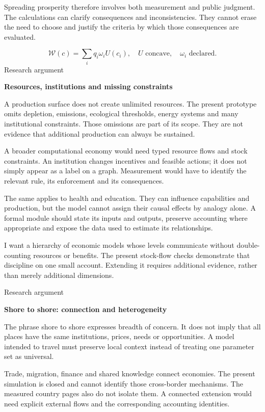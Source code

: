 \documentclass[10pt]{article}
\begin{document}
Spreading prosperity therefore involves both measurement and public judgment. The calculations can clarify consequences and inconsistencies. They cannot erase the need to choose and justify the criteria by which those consequences are evaluated.\par
\[\mathcal W(c)=\sum_iq_i\omega_i U(c_i),\quad U\text{ concave},\quad\omega_i\text{ declared}.\]
\clearpage
{\small\color{accent}Research argument}\par
{\LARGE\bfseries\color{ink}Resources, institutions and missing constraints}\par\vspace{7pt}
A production surface does not create unlimited resources. The present prototype omits depletion, emissions, ecological thresholds, energy systems and many institutional constraints. Those omissions are part of its scope. They are not evidence that additional production can always be sustained.\par
A broader computational economy would need typed resource flows and stock constraints. An institution changes incentives and feasible actions; it does not simply appear as a label on a graph. Measurement would have to identify the relevant rule, its enforcement and its consequences.\par
The same applies to health and education. They can influence capabilities and production, but the model cannot assign their causal effects by analogy alone. A formal module should state its inputs and outputs, preserve accounting where appropriate and expose the data used to estimate its relationships.\par
I want a hierarchy of economic models whose levels communicate without double-counting resources or benefits. The present stock-flow checks demonstrate that discipline on one small account. Extending it requires additional evidence, rather than merely additional dimensions.\par
\clearpage
{\small\color{accent}Research argument}\par
{\LARGE\bfseries\color{ink}Shore to shore: connection and heterogeneity}\par\vspace{7pt}
The phrase shore to shore expresses breadth of concern. It does not imply that all places have the same institutions, prices, needs or opportunities. A model intended to travel must preserve local context instead of treating one parameter set as universal.\par
Trade, migration, finance and shared knowledge connect economies. The present simulation is closed and cannot identify those cross-border mechanisms. The measured country pages also do not isolate them. A connected extension would need explicit external flows and the corresponding accounting identities.\par
\end{document}
